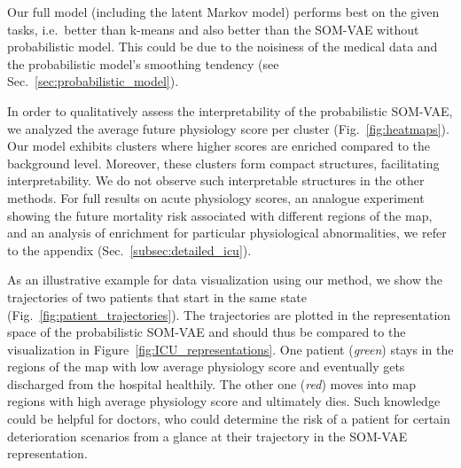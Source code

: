 \documentclass{article}
\begin{document}
Our full model (including the latent Markov model) performs best on the given tasks, i.e.\ better than k-means and also better than the SOM-VAE without probabilistic model.
This could be due to the noisiness of the medical data and the probabilistic model's smoothing tendency (see Sec.~\ref{sec:probabilistic_model}).

In order to qualitatively assess the interpretability of the probabilistic SOM-VAE, we analyzed the average future physiology score per cluster (Fig.~\ref{fig:heatmaps}).
Our model exhibits clusters where higher scores are enriched compared to the background level.
Moreover, these clusters form compact structures, facilitating interpretability.
We do not observe such interpretable structures in the other methods. For full results on acute physiology scores, an analogue experiment showing the 
future mortality risk associated with different regions of the map, and an analysis of enrichment for
particular physiological abnormalities, we refer to the appendix (Sec.\ \ref{subsec:detailed_icu}). 

As an illustrative example for data visualization using our method, we show the trajectories of two patients that start in the same state (Fig.~\ref{fig:patient_trajectories}).
The trajectories are plotted in the representation space of the probabilistic SOM-VAE and should thus be compared to the visualization in Figure~\ref{fig:ICU_representations}.
One patient (\emph{green}) stays in the regions of the map with low average physiology score and eventually gets discharged from the hospital healthily.
The other one (\emph{red}) moves into map regions with high average physiology score and ultimately dies.
Such knowledge could be helpful for doctors, who could determine the risk of a patient for certain deterioration scenarios from a glance at their trajectory in the SOM-VAE representation.
\end{document}

